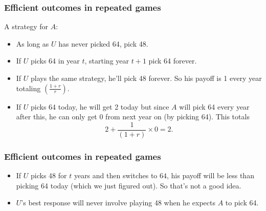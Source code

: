 \documentclass[xcolor=pdftex,dvipsnames]{beamer}
\begin{document}
  \begin{frame}
    \frametitle{Efficient outcomes in repeated games}
    A strategy for $A$:

    \begin{itemize}[<+->]
    \item As long as $U$ has never picked 64, pick 48.

    \item If $U$ picks 64 in year $t$, starting year $t+1$ pick 64 forever.
    \end{itemize}
    \begin{itemize}
    \item<4-> If $U$ plays the same strategy, he'll pick 48
      forever. So   his payoff is 1 every year
      totaling $\left(\frac{1+r}{r}\right)$.
    \item <5-> If $U$ picks 64 today, he will get 2 today but
        since $A$ will pick 64 every year after this, he can only get
        0 from next year on (by picking 64). This totals 
        \[
        2 +\frac{1}{(1+r)} \times 0 = 2.
        \]
    \end{itemize}


  \end{frame}

  \begin{frame}
    \frametitle{Efficient outcomes in repeated games}
    \begin{itemize}[<+->]
    \item If $U$ picks 48 for $t$ years and then switches to $64$, his
      payoff will be less than picking  64 today (which we just
      figured out). So that's not a good idea.

      \item $U$'s best response will never involve playing 48 when he
        expects $A$ to pick  64.
    \end{itemize}




  \end{frame}
\end{document}
